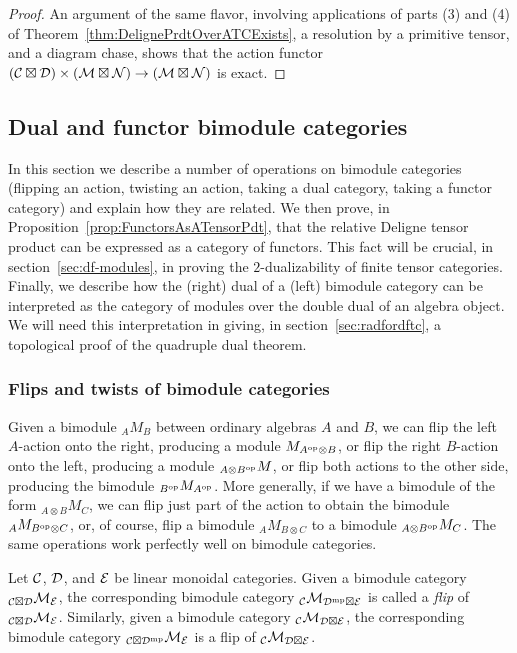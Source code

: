\documentclass{amsart}
\begin{document}
\begin{proof}
An argument of the same flavor, involving applications of parts (3) and (4) of Theorem~\ref{thm:DelignePrdtOverATCExists}, a resolution by a primitive tensor, and a diagram chase, shows that the action functor $(\mathcal C \boxtimes \mathcal D) \times (\mathcal M \boxtimes \mathcal N) \rightarrow (\mathcal M \boxtimes \mathcal N)$ is exact.
\end{proof}


\subsection{Dual and functor bimodule categories} \label{sec:tc-bimodules}

In this section we describe a number of operations on bimodule categories (flipping an action, twisting an action, taking a dual category, taking a functor category) and explain how they are related.  We then prove, in Proposition~\ref{prop:FunctorsAsATensorPdt}, that the relative Deligne tensor product can be expressed as a category of functors.  This fact will be crucial, in section~\ref{sec:df-modules}, in proving the $2$-dualizability of finite tensor categories.  Finally, we describe how the (right) dual of a (left) bimodule category can be interpreted as the category of modules over the double dual of an algebra object.  We will need this interpretation in giving, in section~\ref{sec:radfordftc}, a topological proof of the quadruple dual theorem.

\subsubsection{Flips and twists of bimodule categories} \label{sec:fliptwist}

Given a bimodule ${}_A M_B$ between ordinary algebras $A$ and $B$, we can flip the left $A$-action onto the right, producing a module $M_{A^{\mathrm{op}} \otimes B}$, or flip the right $B$-action onto the left, producing a module ${}_{A \otimes B^{\mathrm{op}}} M$, or flip both actions to the other side, producing the bimodule ${}_{B^{\mathrm{op}}} M_{A^{\mathrm{op}}}$.  More generally, if we have a bimodule of the form ${}_{A \otimes B} M_C$, we can flip just part of the action to obtain the bimodule ${}_A M_{B^{\mathrm{op}} \otimes C}$, or, of course, flip a bimodule ${}_A M_{B \otimes C}$ to a bimodule ${}_{A \otimes B^{\mathrm{op}}} M_C$.  The same operations work perfectly well on bimodule categories.

\begin{definition}
Let $\mathcal C$, $\mathcal D$, and $\mathcal E$ be linear monoidal categories.  Given a bimodule category ${}_{\mathcal C \boxtimes \mathcal D} \mathcal M_\mathcal E$, the corresponding bimodule category ${}_{\mathcal C} \mathcal M_{\mathcal D^{\mathrm{mp}} \boxtimes \mathcal E}$ is called a \emph{flip} of ${}_{\mathcal C \boxtimes \mathcal D} \mathcal M_\mathcal E$.  Similarly, given a bimodule category ${}_\mathcal C \mathcal M_{\mathcal D \boxtimes \mathcal E}$, the corresponding bimodule category ${}_{\mathcal C \boxtimes \mathcal D^{\mathrm{mp}}} \mathcal M_\mathcal E$ is a flip of ${}_\mathcal C \mathcal M_{\mathcal D \boxtimes \mathcal E}$.
\end{definition}
\end{document}
